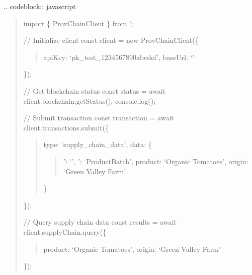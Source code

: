 \documentclass[letterpaper,10pt,english]{sphinxmanual}
\begin{document}
\sphinxAtStartPar
{}
.. code\sphinxhyphen{}block:: javascript
\begin{quote}

\sphinxAtStartPar
import \{ ProvChainClient \} from ’;

\sphinxAtStartPar
// Initialize client
const client = new ProvChainClient(\{
\begin{quote}

\sphinxAtStartPar
apiKey: ‘pk\_test\_1234567890abcdef’,
baseUrl: ‘’
\end{quote}

\sphinxAtStartPar
\});

\sphinxAtStartPar
// Get blockchain status
const status = await client.blockchain.getStatus();
console.log();

\sphinxAtStartPar
// Submit transaction
const transaction = await client.transactions.submit(\{
\begin{quote}

\sphinxAtStartPar
type: ‘supply\_chain\_data’,
data: \{
\begin{quote}

\sphinxAtStartPar
{}’: ‘’,
’: ‘ProductBatch’,
product: ‘Organic Tomatoes’,
origin: ‘Green Valley Farm’
\end{quote}

\sphinxAtStartPar
\}
\end{quote}

\sphinxAtStartPar
\});

\sphinxAtStartPar
// Query supply chain data
const results = await client.supplyChain.query(\{
\begin{quote}

\sphinxAtStartPar
product: ‘Organic Tomatoes’,
origin: ‘Green Valley Farm’
\end{quote}

\sphinxAtStartPar
\});
\end{quote}
\end{document}
